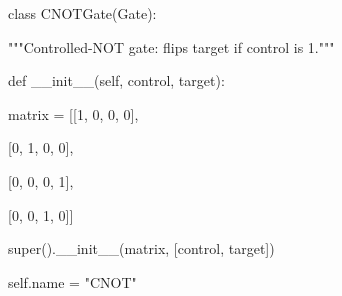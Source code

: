 \documentclass[%
oneside,                 %
final,                   %
10pt]{article}
\begin{document}
\bpycod
class CNOTGate(Gate):

    """Controlled-NOT gate: flips target if control is 1."""

    def __init__(self, control, target):

        matrix = [[1, 0, 0, 0],

                  [0, 1, 0, 0],

                  [0, 0, 0, 1],

                  [0, 0, 1, 0]]

        super().__init__(matrix, [control, target])

        self.name = "CNOT"
\end{document}
